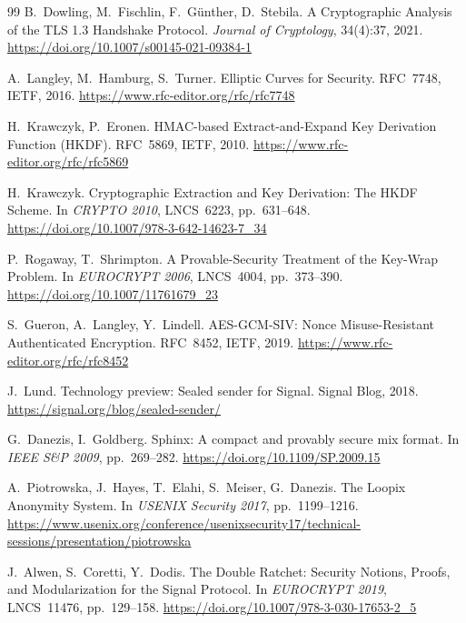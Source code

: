 \documentclass[11pt,a4paper]{article}
\theoremstyle{definition}
\begin{document}
\begin{thebibliography}{99}
B.~Dowling, M.~Fischlin, F.~G{\"u}nther, D.~Stebila.
\newblock A Cryptographic Analysis of the TLS 1.3 Handshake Protocol.
\newblock \emph{Journal of Cryptology}, 34(4):37, 2021.
\newblock \url{https://doi.org/10.1007/s00145-021-09384-1}

A.~Langley, M.~Hamburg, S.~Turner.
\newblock Elliptic Curves for Security.
\newblock RFC~7748, IETF, 2016.
\newblock \url{https://www.rfc-editor.org/rfc/rfc7748}

H.~Krawczyk, P.~Eronen.
\newblock HMAC-based Extract-and-Expand Key Derivation Function (HKDF).
\newblock RFC~5869, IETF, 2010.
\newblock \url{https://www.rfc-editor.org/rfc/rfc5869}

H.~Krawczyk.
\newblock Cryptographic Extraction and Key Derivation: The HKDF Scheme.
\newblock In \emph{CRYPTO 2010}, LNCS~6223, pp.~631--648.
\newblock \url{https://doi.org/10.1007/978-3-642-14623-7_34}

P.~Rogaway, T.~Shrimpton.
\newblock A Provable-Security Treatment of the Key-Wrap Problem.
\newblock In \emph{EUROCRYPT 2006}, LNCS~4004, pp.~373--390.
\newblock \url{https://doi.org/10.1007/11761679_23}

S.~Gueron, A.~Langley, Y.~Lindell.
\newblock AES-GCM-SIV: Nonce Misuse-Resistant Authenticated Encryption.
\newblock RFC~8452, IETF, 2019.
\newblock \url{https://www.rfc-editor.org/rfc/rfc8452}

J.~Lund.
\newblock Technology preview: Sealed sender for Signal.
\newblock Signal Blog, 2018.
\newblock \url{https://signal.org/blog/sealed-sender/}

G.~Danezis, I.~Goldberg.
\newblock Sphinx: A compact and provably secure mix format.
\newblock In \emph{IEEE S\&P 2009}, pp.~269--282.
\newblock \url{https://doi.org/10.1109/SP.2009.15}

A.~Piotrowska, J.~Hayes, T.~Elahi, S.~Meiser, G.~Danezis.
\newblock The Loopix Anonymity System.
\newblock In \emph{USENIX Security 2017}, pp.~1199--1216.
\newblock \url{https://www.usenix.org/conference/usenixsecurity17/technical-sessions/presentation/piotrowska}

J.~Alwen, S.~Coretti, Y.~Dodis.
\newblock The Double Ratchet: Security Notions, Proofs, and
  Modularization for the Signal Protocol.
\newblock In \emph{EUROCRYPT 2019}, LNCS~11476, pp.~129--158.
\newblock \url{https://doi.org/10.1007/978-3-030-17653-2_5}


\end{thebibliography}
\end{document}
